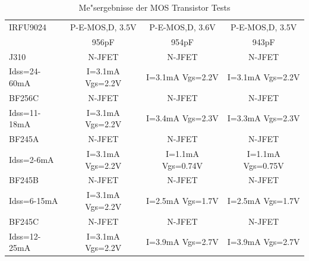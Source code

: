 \begin{table}[H]
\begin{center}
\begin{tabular}{| l | c | c | c |}
    \hline
IRFU9024     & P-E-MOS,D, 3.5V  & P-E-MOS,D, 3.6V  & P-E-MOS,D, 3.5V \\
             & 956pF            & 954pF            & 943pF \\
    \hline
J310         & N-JFET           & N-JFET           & N-JFET\\
Idss=24-60mA & I=3.1mA Vgs=2.2V & I=3.1mA Vgs=2.2V & I=3.1mA Vgs=2.2V \\
    \hline
BF256C       & N-JFET           & N-JFET           & N-JFET\\
Idss=11-18mA & I=3.1mA Vgs=2.2V & I=3.4mA Vgs=2.3V & I=3.3mA Vgs=2.3V \\
    \hline
BF245A       & N-JFET           & N-JFET           & N-JFET\\
Idss=2-6mA   & I=3.1mA Vgs=2.2V & I=1.1mA Vgs=0.74V & I=1.1mA Vgs=0.75V \\
    \hline
BF245B       & N-JFET           & N-JFET           & N-JFET\\
Idss=6-15mA  & I=3.1mA Vgs=2.2V & I=2.5mA Vgs=1.7V & I=2.5mA Vgs=1.7V \\
    \hline
BF245C       & N-JFET           & N-JFET           & N-JFET\\
Idss=12-25mA & I=3.1mA Vgs=2.2V & I=3.9mA Vgs=2.7V & I=3.9mA Vgs=2.7V \\
    \hline
    \end{tabular}
  \end{center}
  \caption{Me"sergebnisse der MOS Transistor Tests}
  \label{tab:mos} 
\end{table}
